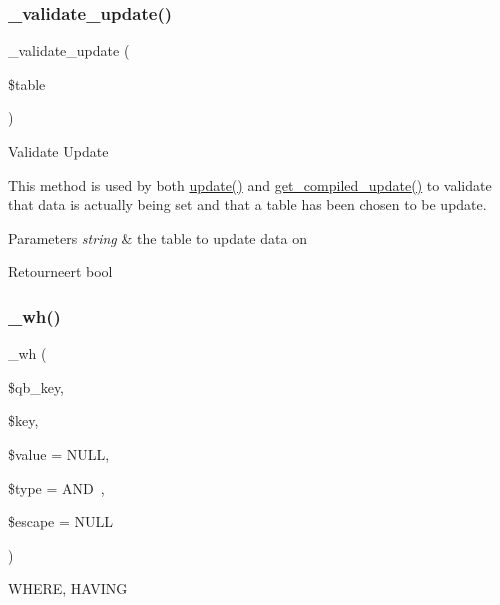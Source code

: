 \subsubsection{\texorpdfstring{\_validate\_update()}{\_validate\_update()}}
{\footnotesize\ttfamily \+\_\+validate\+\_\+update (\begin{DoxyParamCaption}\item[{}]{\$table }\end{DoxyParamCaption})\hspace{0.3cm}{\ttfamily [protected]}}

Validate Update

This method is used by both \mbox{\hyperlink{class_c_i___d_b__query__builder_a130a26da2dd4e4582ee18f42d71fe6e4}{update()}} and \mbox{\hyperlink{class_c_i___d_b__query__builder_a77fb150224714405067df7c300c317b0}{get\+\_\+compiled\+\_\+update()}} to validate that data is actually being set and that a table has been chosen to be update.


\begin{DoxyParams}{Parameters}
{\em string} & the table to update data on \\
\hline
\end{DoxyParams}
\begin{DoxyReturn}{Retourneert}
bool 
\end{DoxyReturn}
\mbox{\label{class_c_i___d_b__query__builder_a616af9ae6c40b3fe7074a8517207934f}} 
\subsubsection{\texorpdfstring{\_wh()}{\_wh()}}
{\footnotesize\ttfamily \+\_\+wh (\begin{DoxyParamCaption}\item[{}]{\$qb\+\_\+key,  }\item[{}]{\$key,  }\item[{}]{\$value = {\ttfamily NULL},  }\item[{}]{\$type = {\ttfamily \textquotesingle{}AND~\textquotesingle{}},  }\item[{}]{\$escape = {\ttfamily NULL} }\end{DoxyParamCaption})\hspace{0.3cm}{\ttfamily [protected]}}

W\+H\+E\+RE, H\+A\+V\+I\+NG

